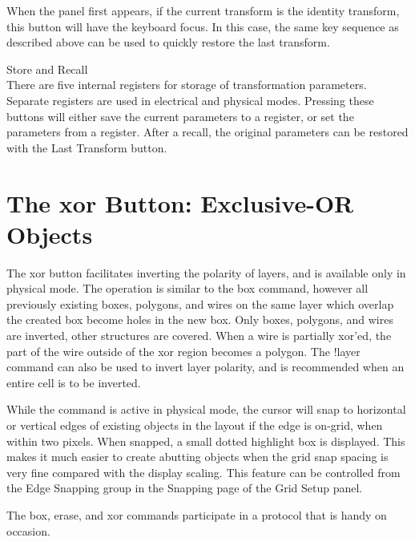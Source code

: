 \begin{description}
When the panel first appears, if the current transform is the identity
transform, this button will have the keyboard focus.  In this case,
the same key sequence as described above can be used to quickly restore
the last transform.

\item{Store and Recall}\\
There are five internal registers for storage of transformation
parameters.  Separate registers are used in electrical and physical
modes.  Pressing these buttons will either save the current parameters
to a register, or set the parameters from a register.  After a recall,
the original parameters can be restored with the {\cb Last Transform}
button.
\end{description}


\section{The {\cb xor} Button: Exclusive-OR Objects}

The {\cb xor} button facilitates inverting the polarity of layers, and
is available only in physical mode.  The operation is similar to the
{\cb box} command, however all previously existing boxes, polygons,
and wires on the same layer which overlap the created box become holes
in the new box.  Only boxes, polygons, and wires are inverted, other
structures are covered.  When a wire is partially xor'ed, the part of
the wire outside of the xor region becomes a polygon.  The {\cb
!layer} command can also be used to invert layer polarity, and is
recommended when an entire cell is to be inverted.

While the command is active in physical mode, the cursor will snap to
horizontal or vertical edges of existing objects in the layout if the
edge is on-grid, when within two pixels.  When snapped, a small dotted
highlight box is displayed.  This makes it much easier to create
abutting objects when the grid snap spacing is very fine compared with
the display scaling.  This feature can be controlled from the {\cb
Edge Snapping} group in the {\cb Snapping} page of the {\cb Grid
Setup} panel.

The {\cb box}, {\cb erase}, and {\cb xor} commands participate in a
protocol that is handy on occasion.

